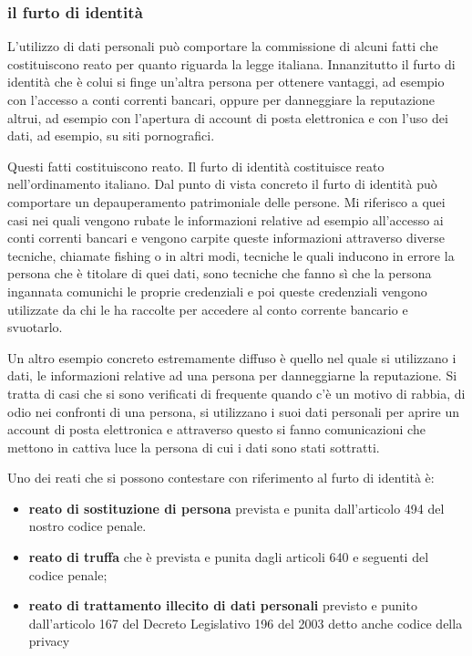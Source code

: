 \subsubsection{il furto di identità}
L'utilizzo di dati personali può comportare la commissione di alcuni fatti che costituiscono reato per quanto riguarda la legge italiana. Innanzitutto il furto di identità che è colui si finge un'altra persona per ottenere vantaggi, ad esempio con l'accesso a conti correnti bancari, oppure per danneggiare la reputazione altrui, ad esempio con l'apertura di account di posta elettronica e con l'uso dei dati, ad esempio, su siti pornografici.\par
Questi fatti costituiscono reato. Il furto di identità costituisce reato nell'ordinamento italiano. Dal punto di vista concreto il furto di identità può comportare un depauperamento patrimoniale delle persone. Mi riferisco a quei casi nei quali vengono rubate le informazioni relative ad esempio all'accesso ai conti correnti bancari e vengono carpite queste informazioni attraverso diverse tecniche, chiamate fishing o in altri modi, tecniche le quali inducono in errore la persona che è titolare di quei dati, sono tecniche che fanno sì che la persona ingannata comunichi le proprie credenziali e poi queste credenziali vengono utilizzate da chi le ha raccolte per accedere al conto corrente bancario e svuotarlo.\par
Un altro esempio concreto estremamente diffuso è quello nel quale si utilizzano i dati, le informazioni relative ad una persona per danneggiarne la reputazione. Si tratta di casi che si sono verificati di frequente quando c'è un motivo di rabbia, di odio nei confronti di una persona, si utilizzano i suoi dati personali per aprire un account di posta elettronica e attraverso questo si fanno comunicazioni che mettono in cattiva luce la persona di cui i dati sono stati sottratti.\par
Uno dei reati che si possono contestare con riferimento al furto di identità è:


\begin{itemize}
    \item \textbf{reato di sostituzione di persona} prevista e punita dall'articolo 494 del nostro codice penale. 
    \item \textbf{reato di truffa} che è prevista e punita dagli articoli 640 e seguenti del codice penale;
    \item \textbf{reato di trattamento illecito di dati personali} previsto e punito dall'articolo 167 del Decreto Legislativo 196 del 2003 detto anche codice della privacy
\end{itemize}

